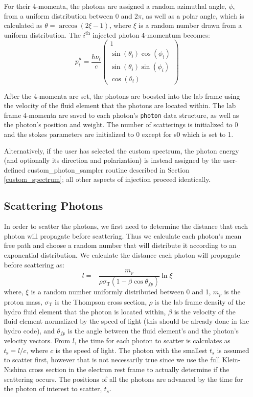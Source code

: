 \documentclass[12pt,a4paper]{article}
\begin{document}
For their 4-momenta, the photons are assigned a random azimuthal angle, $\phi$, from a uniform distribution between $0$ and $2\pi$, as well as a polar angle, which is calculated as $\theta=\arccos(2\xi-1)$, where $\xi$ is a random number drawn from a uniform distribution. The $i^\mathrm{th}$ injected photon 4-momentum becomes:
\[
p^\mu_i=\frac{h\nu_i}{c}\begin{pmatrix}
1 \\ \sin(\theta_i) \cos(\phi_i) \\ \sin(\theta_i) \sin(\phi_i) \\ \cos(\theta_i)
\end{pmatrix}
\]

After the 4-momenta are set, the photons are boosted into the lab frame using the velocity of the fluid element that the photons are located within. The lab frame 4-momenta are saved to each photon's \texttt{photon} data structure, as well as the photon's position and weight. The number of scatterings is initialized to 0 and the stokes parameters are initialized to 0 except for s0 which is set to 1.

Alternatively, if the user has selected the custom spectrum, the photon energy (and optionally its direction and polarization) is instead assigned by the user-defined custom\_photon\_sampler routine described in Section \ref{custom_spectrum}; all other aspects of injection proceed identically.


\subsection{Scattering Photons} \label{scatt}

In order to scatter the photons, we first need to determine the distance that each photon will propagate before scattering. Thus we calculate each photon's mean free path and choose a random number that will distribute it according to an exponential distribution. We calculate the distance each photon will propagate before scattering as:
\[
l=-\frac{m_p}{\rho\sigma_\mathrm{T}(1-\beta\cos\theta_{fp})}\ln\xi
\]
where, $\xi$ is a random number uniformly distributed between 0 and 1, $m_p$ is the proton mass, $\sigma_\mathrm{T}$ is the Thompson cross section, $\rho$ is the lab frame density of the hydro fluid element that the photon is located within, $\beta$ is the velocity of the fluid element normalized by the speed of light (this should be already done in the hydro code), and $\theta_{fp}$ is the angle between the fluid element's and the photon's velocity vectors. From $l$, the time for each photon to scatter is calculates as $t_\mathrm{s}=l/c$, where $c$ is the speed of light. The photon with the smallest $t_s$ is assumed to scatter first, however that is not necessarily true since we use the full Klein-Nishina cross section in the electron rest frame to actually determine if the scattering occurs. The positions of all the photons are advanced by the time for the photon of interest to scatter, $t_s$.
\end{document}
